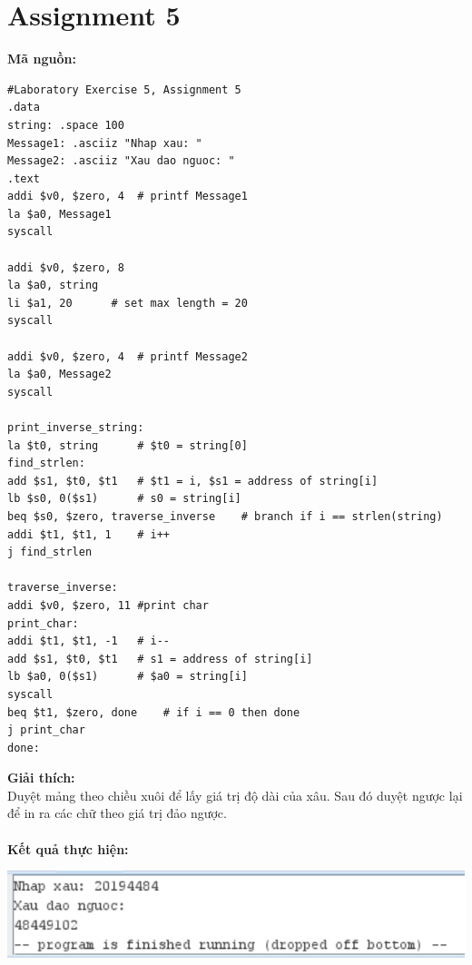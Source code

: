 \documentclass[12pt,a4paper,oneside]{article}
\begin{document}
\section*{Assignment 5}
\textbf{Mã nguồn:}
\begin{lstlisting}
#Laboratory Exercise 5, Assignment 5
.data
string: .space 100
Message1: .asciiz "Nhap xau: "
Message2: .asciiz "Xau dao nguoc: "
.text
addi $v0, $zero, 4	# printf Message1
la $a0, Message1
syscall

addi $v0, $zero, 8
la $a0, string
li $a1, 20		# set max length = 20
syscall

addi $v0, $zero, 4	# printf Message2
la $a0, Message2
syscall

print_inverse_string:
la $t0, string		# $t0 = string[0]
find_strlen:
add $s1, $t0, $t1	# $t1 = i, $s1 = address of string[i]
lb $s0, 0($s1)		# s0 = string[i]
beq $s0, $zero, traverse_inverse	# branch if i == strlen(string)	
addi $t1, $t1, 1	# i++
j find_strlen

traverse_inverse:
addi $v0, $zero, 11	#print char
print_char:
addi $t1, $t1, -1	# i--
add $s1, $t0, $t1	# s1 = address of string[i]
lb $a0, 0($s1)		# $a0 = string[i]
syscall
beq $t1, $zero, done	# if i == 0 then done
j print_char
done:
\end{lstlisting}
\textbf{Giải thích:}\\
Duyệt mảng theo chiều xuôi để lấy giá trị độ dài của xâu. Sau đó duyệt ngược lại để in ra các chữ theo giá trị đảo ngược.\\\\
\textbf{Kết quả thực hiện:}
\begin{center}
\includegraphics[scale=1]{5}
\end{center}
\end{document}
